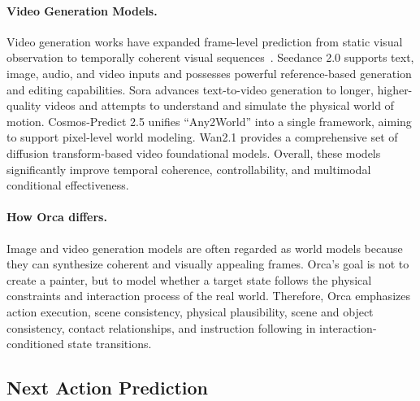 \paragraph{Video Generation Models.}\label{sec:videogms}
Video generation works have expanded frame-level prediction from static visual observation to temporally coherent visual sequences~\citep{videoworld,VideoWorld-2,cognitive_map}. Seedance 2.0 \citep{seedance2.0} supports text, image, audio, and video inputs and possesses powerful reference-based generation and editing capabilities. Sora advances text-to-video generation to longer, higher-quality videos and attempts to understand and simulate the physical world of motion. Cosmos-Predict 2.5 \citep{cosmospredict2.5} unifies ``Any2World'' into a single framework, aiming to support pixel-level world modeling. Wan2.1 \citep{wan2.1} provides a comprehensive set of diffusion transform-based video foundational models. Overall, these models significantly improve temporal coherence, controllability, and multimodal conditional effectiveness.

\vspace{-0.5em}
\paragraph{How Orca differs.}
Image and video generation models are often regarded as world models because they can synthesize coherent and visually appealing frames.
Orca's goal is not to create a painter, but to model whether a target state follows the physical constraints and interaction process of the real world.
Therefore, Orca emphasizes action execution, scene consistency, physical plausibility, scene and object consistency, contact relationships, and instruction following in interaction-conditioned state transitions.

\vspace{-1em}
\subsection{Next Action Prediction}\label{sec:nap}

